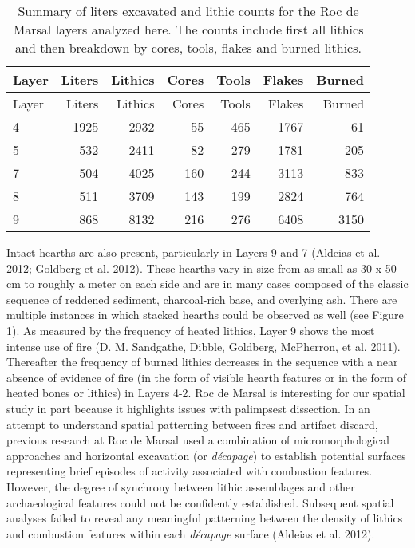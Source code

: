 \documentclass[smallextended]{svjour3}       %
\begin{document}
\begin{longtable}[]{@{}lrrrrrr@{}}
\caption{Summary of liters excavated and lithic counts for the Roc de
Marsal layers analyzed here. The counts include first all lithics and
then breakdown by cores, tools, flakes and burned
lithics.}\tabularnewline
\toprule
Layer & Liters & Lithics & Cores & Tools & Flakes &
Burned\tabularnewline
\midrule
\endfirsthead
\toprule
Layer & Liters & Lithics & Cores & Tools & Flakes &
Burned\tabularnewline
\midrule
\endhead
4 & 1925 & 2932 & 55 & 465 & 1767 & 61\tabularnewline
5 & 532 & 2411 & 82 & 279 & 1781 & 205\tabularnewline
7 & 504 & 4025 & 160 & 244 & 3113 & 833\tabularnewline
8 & 511 & 3709 & 143 & 199 & 2824 & 764\tabularnewline
9 & 868 & 8132 & 216 & 276 & 6408 & 3150\tabularnewline
\bottomrule
\end{longtable}

Intact hearths are also present, particularly in Layers 9 and 7 (Aldeias
et al. 2012; Goldberg et al. 2012). These hearths vary in size from as
small as 30 x 50 cm to roughly a meter on each side and are in many
cases composed of the classic sequence of reddened sediment,
charcoal-rich base, and overlying ash. There are multiple instances in
which stacked hearths could be observed as well (see Figure 1). As
measured by the frequency of heated lithics, Layer 9 shows the most
intense use of fire (D. M. Sandgathe, Dibble, Goldberg, McPherron, et
al. 2011). Thereafter the frequency of burned lithics decreases in the
sequence with a near absence of evidence of fire (in the form of visible
hearth features or in the form of heated bones or lithics) in Layers
4-2. Roc de Marsal is interesting for our spatial study in part because
it highlights issues with palimpsest dissection. In an attempt to
understand spatial patterning between fires and artifact discard,
previous research at Roc de Marsal used a combination of
micromorphological approaches and horizontal excavation (or
\emph{décapage}) to establish potential surfaces representing brief
episodes of activity associated with combustion features. However, the
degree of synchrony between lithic assemblages and other archaeological
features could not be confidently established. Subsequent spatial
analyses failed to reveal any meaningful patterning between the density
of lithics and combustion features within each \emph{décapage} surface
(Aldeias et al. 2012).
\end{document}
